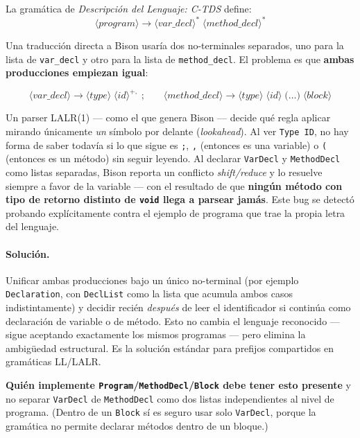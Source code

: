 \documentclass[11pt,a4paper]{article}
\begin{document}
La gram\'atica de \emph{Descripci\'on del Lenguaje: C-TDS} define:
\[
\langle program \rangle \rightarrow \langle var\_decl \rangle^{*}\; \langle method\_decl \rangle^{*}
\]

Una traducci\'on directa a Bison usar\'ia dos no-terminales separados,
uno para la lista de \texttt{var\_decl} y otro para la lista de
\texttt{method\_decl}. El problema es que \textbf{ambas producciones
empiezan igual}:

\[
\langle var\_decl \rangle \rightarrow \langle type \rangle\; \langle id \rangle^{+,}\; \text{;}
\qquad
\langle method\_decl \rangle \rightarrow \langle type \rangle\; \langle id \rangle\; \text{(} \ldots \text{)}\; \langle block \rangle
\]

Un parser LALR(1) --- como el que genera Bison --- decide qu\'e regla
aplicar mirando \'unicamente \emph{un} s\'imbolo por delante
(\emph{lookahead}). Al ver \texttt{Type ID}, no hay forma de saber
todav\'ia si lo que sigue es \texttt{;}, \texttt{,} (entonces es una
variable) o \texttt{(} (entonces es un m\'etodo) sin seguir leyendo. Al
declarar \texttt{VarDecl} y \texttt{MethodDecl} como listas separadas,
Bison reporta un conflicto \emph{shift/reduce} y lo resuelve siempre a
favor de la variable --- con el resultado de que \textbf{ning\'un
m\'etodo con tipo de retorno distinto de \texttt{void} llega a
parsear jam\'as}. Este bug se detect\'o probando expl\'icitamente contra
el ejemplo de programa que trae la propia letra del lenguaje.

\paragraph{Soluci\'on.} Unificar ambas producciones bajo un \'unico
no-terminal (por ejemplo \texttt{Declaration}, con
\texttt{DeclList} como la lista que acumula ambos casos indistintamente)
y decidir reci\'en \emph{despu\'es} de leer el identificador si contin\'ua
como declaraci\'on de variable o de m\'etodo. Esto no cambia el lenguaje
reconocido --- sigue aceptando exactamente los mismos programas --- pero
elimina la ambig\"uedad estructural. Es la soluci\'on est\'andar para
prefijos compartidos en gram\'aticas LL/LALR.

\textbf{Qui\'en implemente \texttt{Program}/\texttt{MethodDecl}/\texttt{Block}
debe tener esto presente} y no separar \texttt{VarDecl} de
\texttt{MethodDecl} como dos listas independientes al nivel de
programa. (Dentro de un \texttt{Block} s\'i es seguro usar solo
\texttt{VarDecl}, porque la gram\'atica no permite declarar m\'etodos
dentro de un bloque.)
\end{document}
